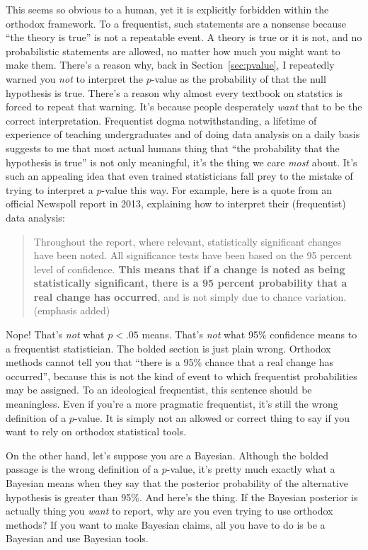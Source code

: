 This seems so obvious to a human, yet it is explicitly forbidden within the orthodox framework. To a frequentist, such statements are a nonsense because ``the theory is true'' is not a repeatable event. A theory is true or it is not, and no probabilistic statements are allowed, no matter how much you might want to make them. There's a reason why, back in Section~\ref{sec:pvalue}, I repeatedly warned you {\it not} to interpret the $p$-value as the probability of that the null hypothesis is true. There's a reason why almost every textbook on statstics is forced to repeat that warning. It's because people desperately {\it want} that to be the correct interpretation. Frequentist dogma notwithstanding, a lifetime of experience of teaching undergraduates and of doing data analysis on a daily basis suggests to me that most actual humans thing that ``the probability that the hypothesis is true'' is not only meaningful, it's the thing we care {\it most} about. It's such an appealing idea that even trained statisticians fall prey to the mistake of trying to interpret a $p$-value this way. For example, here is a quote from an official Newspoll report in 2013, explaining how to interpret their (frequentist) data analysis:
\begin{quote}
Throughout the report, where relevant, statistically significant changes have been noted. All significance tests have been based on the 95 percent level of confidence. {\bf This means that if a change is noted as being statistically significant, there is a 95 percent probability that a real change has occurred}, and is not simply due to chance variation. (emphasis added)
\end{quote}
Nope! That's {\it not} what $p<.05$ means. That's {\it not} what 95\% confidence means to a frequentist statistician. The bolded section is just plain wrong. Orthodox methods cannot tell you that ``there is a 95\% chance that a real change has occurred'', because this is not the kind of event to which frequentist probabilities may be assigned. To an ideological frequentist, this sentence should be meaningless. Even if you're a more pragmatic frequentist, it's still the wrong definition of a $p$-value. It is simply not an allowed or correct thing to say if you want to rely on orthodox statistical tools. 

On the other hand, let's suppose you are a Bayesian. Although the bolded passage is the wrong definition of a $p$-value, it's pretty much exactly what a Bayesian means when they say that the posterior probability of the alternative hypothesis is greater than 95\%. And here's the thing. If the Bayesian posterior is actually thing you {\it want} to report, why are you even trying to use orthodox methods? If you want to make Bayesian claims, all you have to do is be a Bayesian and use Bayesian tools. 

